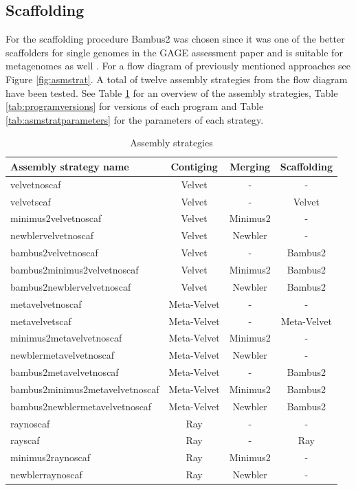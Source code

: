 \documentclass[a4paper,12pt]{report}
\begin{document}
\subsection{Scaffolding}
For the scaffolding procedure Bambus2 was chosen since it was one of the better
scaffolders for single genomes in the GAGE assessment paper
\cite{Salzberg22147368} and is suitable for metagenomes as well
\cite{Koren21926123}. For a flow diagram of previously mentioned approaches see
Figure \ref{fig:asmstrat}. A total of twelve assembly strategies from the flow
diagram have been tested. See Table \ref{tab:asmstrat} for an overview of the
assembly strategies, Table \ref{tab:programversions} for versions of each
program and Table \ref{tab:asmstratparameters} for the parameters of each
strategy.


\begin{table}[h!]
\centering
\begin{tabular}{|l|c|c|c|}
\hline
Assembly strategy name & Contiging & Merging & Scaffolding\\
\hline
velvetnoscaf & Velvet & - & -\\
velvetscaf & Velvet & - & Velvet\\
minimus2velvetnoscaf & Velvet & Minimus2 & -\\
newblervelvetnoscaf & Velvet & Newbler & -\\
bambus2velvetnoscaf & Velvet & - & Bambus2\\
bambus2minimus2velvetnoscaf & Velvet & Minimus2 & Bambus2\\
bambus2newblervelvetnoscaf & Velvet & Newbler & Bambus2\\
metavelvetnoscaf & Meta-Velvet & - & -\\
metavelvetscaf & Meta-Velvet & - & Meta-Velvet\\
minimus2metavelvetnoscaf & Meta-Velvet & Minimus2 & -\\
newblermetavelvetnoscaf & Meta-Velvet & Newbler & -\\
bambus2metavelvetnoscaf & Meta-Velvet & - & Bambus2\\
bambus2minimus2metavelvetnoscaf & Meta-Velvet & Minimus2 & Bambus2\\
bambus2newblermetavelvetnoscaf & Meta-Velvet & Newbler & Bambus2\\
raynoscaf & Ray & - & -\\
rayscaf & Ray & - & Ray\\
minimus2raynoscaf & Ray & Minimus2 & -\\
newblerraynoscaf & Ray & Newbler & -\\
\hline
\end{tabular}
\caption{Assembly strategies}
\label{tab:asmstrat}
\end{table}
\end{document}
